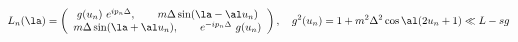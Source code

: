 \begin{equation}
  L_{n}(\la)  =
  \left( \begin{array}{c}  g(u_n)~ e^{ip_n \Delta },
 \qquad  m\Delta  \sin (\la-\al u_n) \\
   m\Delta  \sin (\la+\al u_n),\qquad   e^{-ip_n \Delta }~ g(u_n)
    \end{array} \right), \quad g^2(u_n)= 1 +  m^2  \Delta^2
\cos  { \al (2u_n+{1 }) } 
\ll{L-sg}\end{equation}

